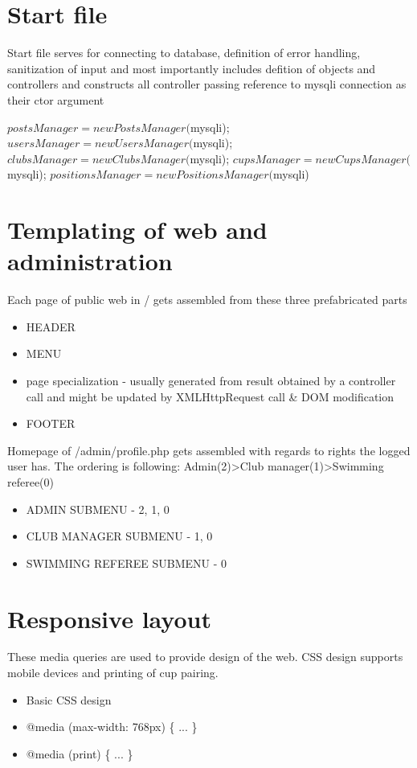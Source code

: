 \section{Start file}
Start file serves for connecting to database, definition of error handling, sanitization of input and most importantly includes defition of objects and controllers and constructs all controller passing reference to mysqli connection as their ctor argument
\begin{phpcode}
$postsManager     = new PostsManager($mysqli);
$usersManager     = new UsersManager($mysqli);
$clubsManager     = new ClubsManager($mysqli);
$cupsManager      = new CupsManager($mysqli);
$positionsManager = new PositionsManager($mysqli)
\end{phpcode} 
\section{Templating of web and administration}
Each page of public web in / gets assembled from these three prefabricated parts
\begin{itemize}
    \item HEADER
    \item MENU
    \item page specialization - usually generated from result obtained by a controller call and might be updated by XMLHttpRequest call \& DOM modification
    \item FOOTER
\end{itemize}
Homepage of /admin/profile.php gets assembled with regards to rights the logged user has. The ordering is following: Admin(2)\textgreater Club manager(1)\textgreater Swimming referee(0)
\begin{itemize}
    \item ADMIN SUBMENU - 2, 1, 0
    \item CLUB MANAGER SUBMENU - 1, 0
    \item SWIMMING REFEREE SUBMENU - 0
\end{itemize}
\section{Responsive layout}
These media queries are used to provide design of the web. CSS design supports mobile devices and printing of cup pairing.
\begin{itemize}
    \item Basic CSS design
    \item @media (max-width: 768px) \{ ... \}
    \item @media (print) \{ ... \}
\end{itemize}
